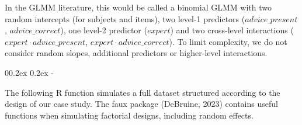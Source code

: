 \documentclass[
  man,floatsintext]{apa6}
\makeatletter
\let\oldsubparagraph\subparagraph
\renewcommand{\subparagraph}[1]{\oldsubparagraph{#1}\mbox{}}
\renewcommand{\subparagraph}[1]{\@startsection{subparagraph}{5}{1em}%
  {0\baselineskip \@plus 0.2ex \@minus 0.2ex}%
  {-\z@\relax}%
  {\normalfont\normalsize\itshape\hspace{\parindent}{#1}\textit{\addperi}}{\relax}}
\makeatother
\begin{document}
In the GLMM literature, this would be called a binomial GLMM with two random intercepts (for subjects and items), two level-1 predictors (\(advice\_present\), \(advice\_correct\)), one level-2 predictor (\(expert\)) and two cross-level interactions (\(expert \cdot advice\_present\), \(expert \cdot advice\_correct\)).
To limit complexity, we do not consider random slopes, additional predictors or higher-level interactions.

\hypertarget{simulation-function-in-r}{%
\subparagraph{Simulation function in R}\label{simulation-function-in-r}}

The following R function simulates a full dataset structured according to the design of our case study.
The faux package (DeBruine, 2023) contains useful functions when simulating factorial designs, including random effects.
\end{document}
